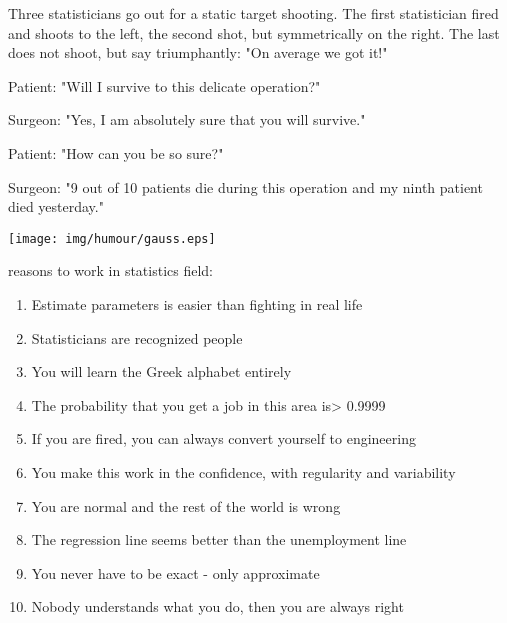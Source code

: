 Three statisticians go out for a static target shooting. The first statistician fired and shoots to the left, the second shot, but symmetrically on the right. The last does not shoot, but say triumphantly: "On average we got it!"
\begin{center}\underline{\hspace{5 cm}}\end{center}

Patient: "Will I survive to this delicate operation?"

Surgeon: "Yes, I am absolutely sure that you will survive."

Patient: "How can you be so sure?"

Surgeon: "9 out of 10 patients die during this operation and my ninth patient died yesterday."
\begin{center}\underline{\hspace{5 cm}}\end{center}
	\begin{center}
	\texttt{[image: img/humour/gauss.eps]}
	\end{center}

 reasons to work in statistics field:
\begin{enumerate}
	\item Estimate parameters is easier than fighting in real life

	\item Statisticians are recognized people

	\item You will learn the Greek alphabet entirely

	\item The probability that you get a job in this area is> 0.9999

	\item If you are fired, you can always convert yourself to engineering

	\item You make this work in the confidence, with regularity and variability

	\item You are normal and the rest of the world is wrong

	\item The regression line seems better than the unemployment line

	\item You never have to be exact - only approximate

	\item Nobody understands what you do, then you are always right
\end{enumerate} 

